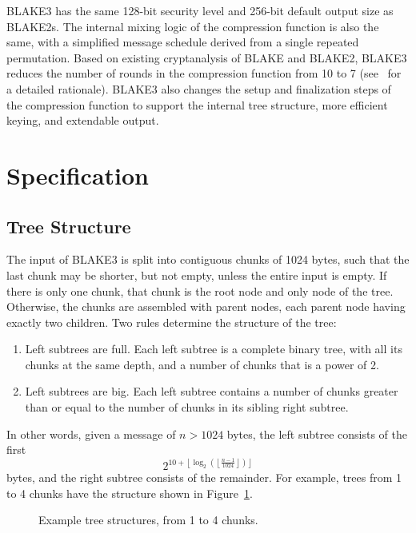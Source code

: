 \documentclass[11pt,notitlepage,a4paper]{article}
\begin{document}
BLAKE3 has the same 128-bit security level and 256-bit default output size as
BLAKE2s. The internal mixing logic of the compression function is also the
same, with a simplified message schedule derived from a single repeated
permutation. Based on existing cryptanalysis of BLAKE and BLAKE2, BLAKE3
reduces the number of rounds in the compression function from 10 to 7
(see~\cite{TMC} for a detailed rationale). BLAKE3 also changes the setup and
finalization steps of the compression function to support the internal tree
structure, more efficient keying, and extendable output.

\section{Specification}\label{sec:specification}

\subsection{Tree Structure}\label{sec:tree}

The input of BLAKE3 is split into contiguous chunks  of 1024 bytes, such
that the last chunk may be shorter, but not empty, unless the entire input is empty. 
If there is only one chunk, that chunk
is the root node and only node of the tree. 
Otherwise, the chunks are assembled with parent nodes, each parent node having exactly two children. 
Two rules determine the structure of the tree:
\begin{enumerate}
    \item Left subtrees are full. Each left subtree is a complete binary tree,
        with all its chunks at the same depth, and a number of chunks that is a
        power of 2.
    \item Left subtrees are big. Each left subtree contains a number of chunks
        greater than or equal to the number of chunks in its sibling right
        subtree.
\end{enumerate}
In other words, given a message of $n > 1024$ bytes, the left subtree consists
of the first $$2^{10 + \left\lfloor \log_2 \left(\left\lfloor \frac{n-1}{1024}
\right\rfloor\right) \right\rfloor}$$ bytes, and the right subtree consists of
the remainder. For example, trees from 1 to 4 chunks have the structure shown
in Figure~\ref{fig:fourchunks}.

\begin{figure}[h]
\centering
 
\caption{Example tree structures, from 1 to 4 chunks.}
\label{fig:fourchunks}
\end{figure}
\end{document}
